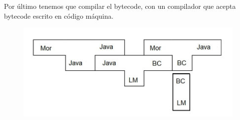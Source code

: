 Por último tenemos que compilar el bytecode, con un compilador que acepta bytecode escrito en código máquina.
\begin{figure}[h]
	\centering
	\includegraphics[width=0.7\linewidth]{img/photo5978652419892031524}
	\caption{}
	\label{fig:photo5978652419892031524}
\end{figure}



